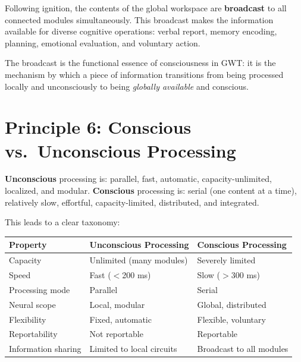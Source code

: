 \documentclass[11pt,a4paper]{report}
\begin{document}
\begin{principlebox}
Following ignition, the contents of the global workspace are \textbf{broadcast} to all connected modules simultaneously. This broadcast makes the information available for diverse cognitive operations: verbal report, memory encoding, planning, emotional evaluation, and voluntary action.
\end{principlebox}

The broadcast is the functional essence of consciousness in GWT: it is the mechanism by which a piece of information transitions from being processed locally and unconsciously to being \emph{globally available} and conscious.

\section{Principle 6: Conscious vs.\ Unconscious Processing}

\begin{principlebox}
\textbf{Unconscious} processing is: parallel, fast, automatic, capacity-unlimited, localized, and modular. \textbf{Conscious} processing is: serial (one content at a time), relatively slow, effortful, capacity-limited, distributed, and integrated.
\end{principlebox}

This leads to a clear taxonomy:

\begin{center}
\renewcommand{\arraystretch}{1.3}
\begin{tabular}{>{\raggedright}p{4cm} >{\raggedright}p{4.5cm} >{\raggedright\arraybackslash}p{4.5cm}}
  \toprule
  \textbf{Property} & \textbf{Unconscious Processing} & \textbf{Conscious Processing} \\
  \midrule
  Capacity & Unlimited (many modules) & Severely limited \\
  Speed & Fast ($<$200 ms) & Slow ($>$300 ms) \\
  Processing mode & Parallel & Serial \\
  Neural scope & Local, modular & Global, distributed \\
  Flexibility & Fixed, automatic & Flexible, voluntary \\
  Reportability & Not reportable & Reportable \\
  Information sharing & Limited to local circuits & Broadcast to all modules \\
  \bottomrule
\end{tabular}
\end{center}
\end{document}
